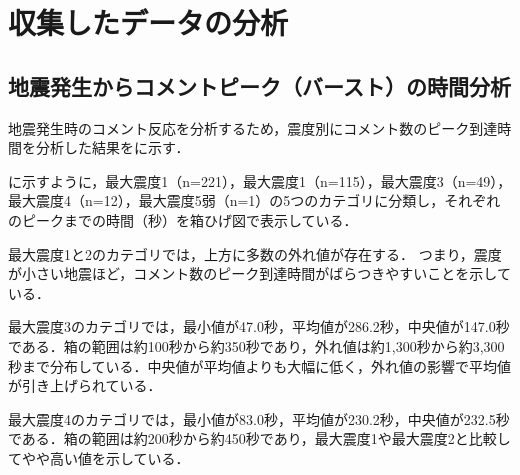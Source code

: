 



\section{収集したデータの分析}

\subsection{地震発生からコメントピーク（バースト）の時間分析}
\label{sec:burst_comment}
地震発生時のコメント反応を分析するため，震度別にコメント数のピーク到達時間を分析した結果をに示す．

\clearpage



に示すように，最大震度1（n=221），最大震度1（n=115），最大震度3（n=49），最大震度4（n=12），最大震度5弱（n=1）の5つのカテゴリに分類し，それぞれのピークまでの時間（秒）を箱ひげ図で表示している．

最大震度1と2のカテゴリでは，上方に多数の外れ値が存在する．
つまり，震度が小さい地震ほど，コメント数のピーク到達時間がばらつきやすいことを示している．

最大震度3のカテゴリでは，最小値が47.0秒，平均値が286.2秒，中央値が147.0秒である．箱の範囲は約100秒から約350秒であり，外れ値は約1,300秒から約3,300秒まで分布している．中央値が平均値よりも大幅に低く，外れ値の影響で平均値が引き上げられている．

最大震度4のカテゴリでは，最小値が83.0秒，平均値が230.2秒，中央値が232.5秒である．箱の範囲は約200秒から約450秒であり，最大震度1や最大震度2と比較してやや高い値を示している．

